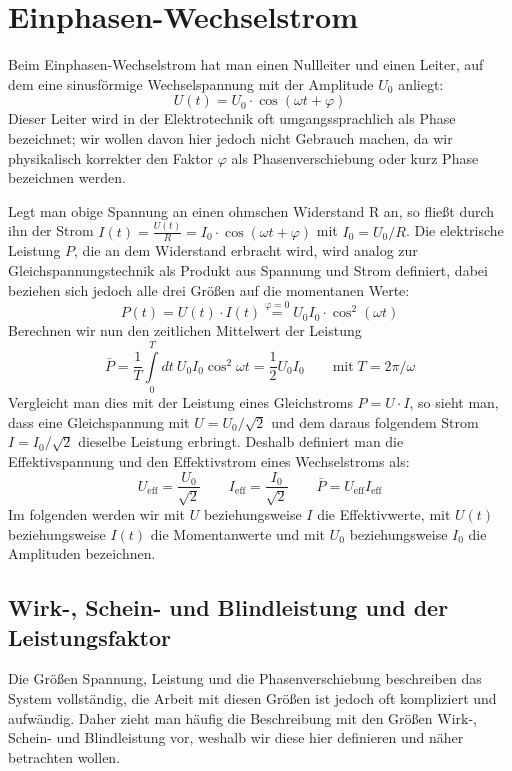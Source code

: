 
\section{Einphasen-Wechselstrom}\label{wechsel}
Beim Einphasen-Wechselstrom hat man einen Nullleiter und einen Leiter, auf dem eine sinusförmige Wechselspannung mit der Amplitude $U_0$ anliegt:
\begin{equation}
U(t)=U_0 \cdot \cos(\omega t + \varphi)
\end{equation}
Dieser Leiter wird in der Elektrotechnik oft umgangssprachlich als Phase bezeichnet; wir wollen davon hier jedoch nicht Gebrauch machen, da wir physikalisch korrekter den Faktor $\varphi$ als Phasenverschiebung oder kurz Phase bezeichnen werden.

Legt man obige Spannung an einen ohmschen Widerstand R an, so fließt durch ihn der Strom $I(t)= \frac{U(t)}{R} = I_0 \cdot \cos(\omega t + \varphi)$ mit $I_0 = U_0/R$.
Die elektrische Leistung $P$, die an dem Widerstand erbracht wird, wird analog zur Gleichspannungstechnik als Produkt aus Spannung und Strom definiert, dabei beziehen sich jedoch alle drei Größen auf die momentanen Werte:
\begin{equation}
P(t) = U(t) \cdot I(t) \stackrel{\mathrm{\varphi=0}}= U_0 I_0 \cdot \cos^2(\omega t)
\end{equation}
Berechnen wir nun den zeitlichen Mittelwert der Leistung
\begin{equation}\label{eq:Wirkleistung_ohne_phi}
\bar{P}=\frac1T \int\limits_0^T dt\: U_0 I_0 \cos^2 \omega t = \frac12 U_0 I_0 \qquad\mathrm{mit}\; T=2\pi/\omega
\end{equation}
Vergleicht man dies mit der Leistung eines Gleichstroms $P=U\cdot I$, so sieht man, dass eine Gleichspannung mit $U=U_0 / \sqrt2$ und dem daraus folgendem Strom $I=I_0 / \sqrt2$ dieselbe Leistung erbringt.
Deshalb definiert man die Effektivspannung und den Effektivstrom eines Wechselstroms als:
\begin{equation*}
U_{\mathrm{eff}} = \frac{U_0}{\sqrt2} \qquad I_{\mathrm{eff}} = \frac{I_0}{\sqrt2} \qquad \bar{P}=U_{\mathrm{eff}}I_{\mathrm{eff}}
\end{equation*}
Im folgenden werden wir mit $U$ beziehungsweise $I$ die Effektivwerte, mit $U(t)$ beziehungsweise $I(t)$ die Momentanwerte und mit $U_0$ beziehungsweise $I_0$ die Amplituden bezeichnen.





\subsection{Wirk-, Schein- und Blindleistung und der Leistungsfaktor}
Die Größen Spannung, Leistung und die Phasenverschiebung beschreiben das System vollständig, die Arbeit mit diesen Größen ist jedoch oft kompliziert und aufwändig. Daher zieht man häufig die Beschreibung mit den Größen Wirk-, Schein- und Blindleistung vor, weshalb wir diese hier definieren und näher betrachten wollen.

